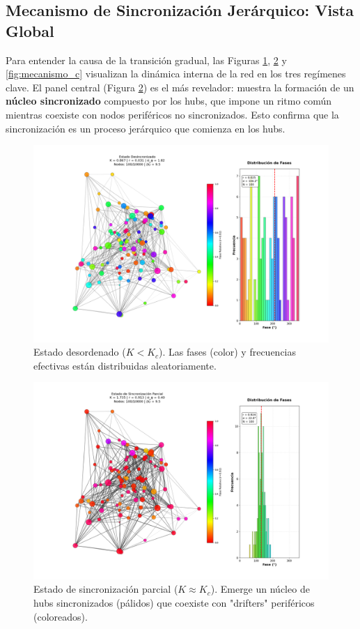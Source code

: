 \documentclass[12pt, a4paper]{article}
\begin{document}
\subsection{Mecanismo de Sincronización Jerárquico: Vista Global}
Para entender la causa de la transición gradual, las Figuras \ref{fig:mecanismo_a}, \ref{fig:mecanismo_b} y \ref{fig:mecanismo_c} visualizan la dinámica interna de la red en los tres regímenes clave. El panel central (Figura \ref{fig:mecanismo_b}) es el más revelador: muestra la formación de un \textbf{núcleo sincronizado} compuesto por los hubs, que impone un ritmo común mientras coexiste con nodos periféricos no sincronizados. Esto confirma que la sincronización es un proceso jerárquico que comienza en los hubs.

\begin{figure}[p]
    \centering
    \includegraphics[width=\textwidth]{img/2_2.png}
    \caption{Estado desordenado ($K < K_c$). Las fases (color) y frecuencias efectivas están distribuidas aleatoriamente.}
    \label{fig:mecanismo_a}
\end{figure}

\begin{figure}[p]
    \centering
    \includegraphics[width=\textwidth]{img/2_4.png}
    \caption{Estado de sincronización parcial ($K \approx K_c$). Emerge un núcleo de hubs sincronizados (pálidos) que coexiste con "drifters" periféricos (coloreados).}
    \label{fig:mecanismo_b}
\end{figure}
\end{document}
